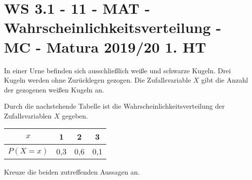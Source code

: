 \section{WS 3.1 - 11 - MAT - Wahrscheinlichkeitsverteilung - MC - Matura 2019/20 1. HT}

\begin{beispiel}[WS 3.1]{1}
In einer Urne befinden sich ausschließlich weiße und schwarze Kugeln. Drei Kugeln werden ohne Zurücklegen gezogen. Die Zufallsvariable $X$ gibt die Anzahl der gezogenen weißen Kugeln an.

Durch die nachstehende Tabelle ist die Wahrscheinlichkeitsverteilung der Zufallsvariablen $X$ gegeben.

\begin{center}
\begin{tabular}{|c|c|c|c|}\hline
\cellcolor[gray]{0.9}$x$&1&2&3\\ \hline
\cellcolor[gray]{0.9}$P(X=x)$&0,3&0,6&0,1\\ \hline
\end{tabular}
\end{center}

Kreuze die beiden zutreffenden Aussagen an.

\end{beispiel}
